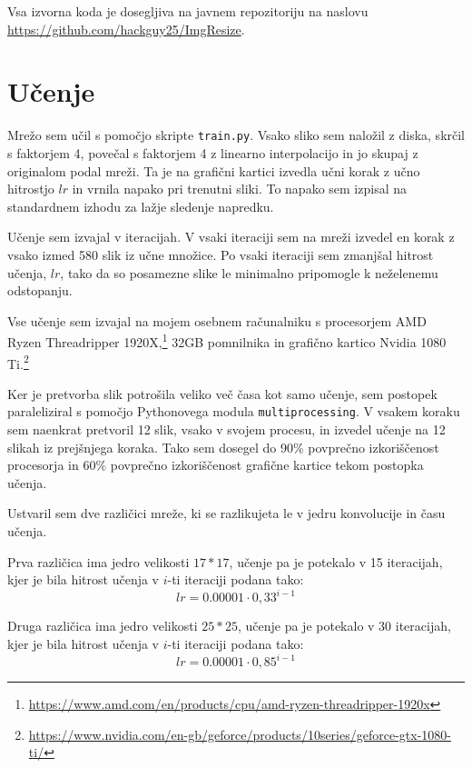\documentclass[a4paper,11pt]{article}
\begin{document}
Vsa izvorna koda je dosegljiva na javnem repozitoriju na naslovu \url{https://github.com/hackguy25/ImgResize}.

\section{Učenje}

Mrežo sem učil s pomočjo skripte \texttt{train.py}.
Vsako sliko sem naložil z diska, skrčil s faktorjem 4, povečal s faktorjem 4 z linearno interpolacijo in jo skupaj z originalom podal mreži.
Ta je na grafični kartici izvedla učni korak z učno hitrostjo $lr$ in vrnila napako pri trenutni sliki.
To napako sem izpisal na standardnem izhodu za lažje sledenje napredku.

Učenje sem izvajal v iteracijah.
V vsaki iteraciji sem na mreži izvedel en korak z vsako izmed 580 slik iz učne množice.
Po vsaki iteraciji sem zmanjšal hitrost učenja, $lr$, tako da so posamezne slike le minimalno pripomogle k neželenemu odstopanju.

Vse učenje sem izvajal na mojem osebnem računalniku s procesorjem AMD Ryzen Threadripper
	1920X,\footnote{\url{https://www.amd.com/en/products/cpu/amd-ryzen-threadripper-1920x}}
	32GB pomnilnika in grafično kartico Nvidia 1080 Ti.\footnote{\url{https://www.nvidia.com/en-gb/geforce/products/10series/geforce-gtx-1080-ti/}}

Ker je pretvorba slik potrošila veliko več časa kot samo učenje, sem postopek paraleliziral s pomočjo Pythonovega modula \texttt{multiprocessing}.
V vsakem koraku sem naenkrat pretvoril 12 slik, vsako v svojem procesu, in izvedel učenje na 12 slikah iz prejšnjega koraka.
Tako sem dosegel do 90\% povprečno izkoriščenost procesorja in 60\% povprečno izkoriščenost grafične kartice tekom postopka učenja.

Ustvaril sem dve različici mreže, ki se razlikujeta le v jedru konvolucije in času učenja.

Prva različica ima jedro velikosti $17 * 17$, učenje pa je potekalo v 15 iteracijah, kjer je bila hitrost učenja v $i$-ti iteraciji podana tako:
\begin{equation*} 
lr = 0.00001 \cdot 0,33^{i - 1}
\end{equation*}

Druga različica ima jedro velikosti $25 * 25$, učenje pa je potekalo v 30 iteracijah, kjer je bila hitrost učenja v $i$-ti iteraciji podana tako:
\begin{equation*} 
lr = 0.00001 \cdot 0,85^{i - 1}
\end{equation*}
\end{document}
